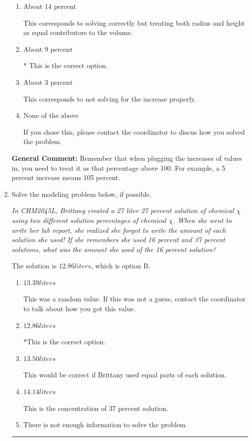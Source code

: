 \documentclass{extbook}[14pt]
\newcommand{\litem}[1]{\item #1

\rule{\textwidth}{0.4pt}}
\begin{document}
\begin{enumerate}
{\begin{enumerate}[label=\Alph*.]
This corresponds to treating both radius and height as equal contributors and not solving correctly.
\item \( \text{About } 14 \text{ percent} \)

This corresponds to solving correctly but treating both radius and height as equal contributors to the volume.
\item \( \text{About } 9 \text{ percent} \)

* This is the correct option.
\item \( \text{About } 3 \text{ percent} \)

This corresponds to not solving for the increase properly.
\item \( \text{None of the above} \)

If you chose this, please contact the coordinator to discus how you solved the problem.
\end{enumerate}

\textbf{General Comment:} Remember that when plugging the increases of values in, you need to treat it as that percentage above 100. For example, a 5 percent increase means 105 percent.
}
\litem{
Solve the modeling problem below, if possible.

\begin{center}
    \textit{ In CHM2045L, Brittany created a 27 liter 27 percent solution of chemical $\chi$ using two different solution percentages of chemical $\chi$. When she went to write her lab report, she realized she forgot to write the amount of each solution she used! If she remembers she used 16 percent and 37 percent solutions, what was the amount she used of the 16 percent solution? }
\end{center}
The solution is \( 12.86 liters \), which is option B.\begin{enumerate}[label=\Alph*.]
\item \( 13.39 liters \)

This was a random value. If this was not a guess, contact the coordinator to talk about how you got this value.
\item \( 12.86 liters \)

*This is the correct option.
\item \( 13.50 liters \)

This would be correct if Brittany used equal parts of each solution.
\item \( 14.14 liters \)

This is the concentration of 37 percent solution.
\item \( \text{There is not enough information to solve the problem.} \)


\end{enumerate}}
\end{enumerate}
\end{document}
